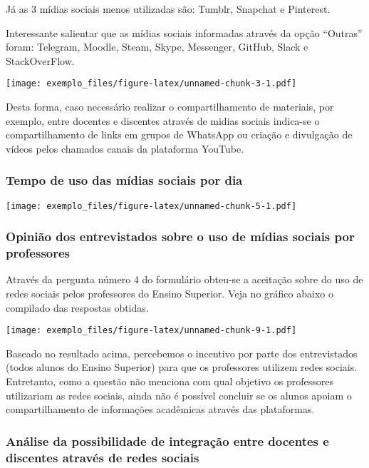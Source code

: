 \documentclass[]{article}
\begin{document}
Já as 3 mídias sociais menos utilizadas são: Tumblr, Snapchat e
Pinterest.

Interessante salientar que as mídias sociais informadas através da opção
``Outras'' foram: Telegram, Moodle, Steam, Skype, Messenger, GitHub,
Slack e StackOverFlow.

\texttt{[image: exemplo\_files/figure-latex/unnamed-chunk-3-1.pdf]}

Desta forma, caso necessário realizar o compartilhamento de materiais,
por exemplo, entre docentes e discentes através de midias sociais
indica-se o compartilhamento de links em grupos de WhatsApp ou criação e
divulgação de vídeos pelos chamados canais da plataforma YouTube.

\subsubsection{Tempo de uso das mídias sociais por
dia}\label{tempo-de-uso-das-midias-sociais-por-dia}

\texttt{[image: exemplo\_files/figure-latex/unnamed-chunk-5-1.pdf]}

\subsubsection{Opinião dos entrevistados sobre o uso de mídias sociais
por
professores}\label{opiniao-dos-entrevistados-sobre-o-uso-de-midias-sociais-por-professores}

Através da pergunta número 4 do formulário obteu-se a aceitação sobre do
uso de redes sociais pelos professores do Ensino Superior. Veja no
gráfico abaixo o compilado das respostas obtidas.

\texttt{[image: exemplo\_files/figure-latex/unnamed-chunk-9-1.pdf]}

Baseado no resultado acima, percebemos o incentivo por parte dos
entrevistados (todos alunos do Ensino Superior) para que os professores
utilizem redes sociais. Entretanto, como a questão não menciona com qual
objetivo os professores utilizariam as redes sociais, ainda não é
possível concluir se os alunos apoiam o compartilhamento de informações
acadêmicas através das plataformas.

\subsubsection{Análise da possibilidade de integração entre docentes e
discentes através de redes
sociais}\label{analise-da-possibilidade-de-integracao-entre-docentes-e-discentes-atraves-de-redes-sociais}
\end{document}

